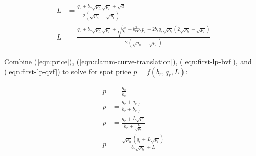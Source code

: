 \documentclass[table, twocolumn]{article}
\begin{document}
\begin{align} \label{eqn:first-lp-quadratic-4}
  L & = \frac{q_r + b_r \sqrt{p_h} \sqrt{p_l} + \sqrt{d}}
  {2(\sqrt{p_h} - \sqrt{p_l})} \nonumber                  \\
  L & = \frac{q_r + b_r \sqrt{p_h} \sqrt{p_l} + \sqrt{
      q_r^2 + b_r^2 p_h p_l + 2 b_r q_r \sqrt{p_h} (2 \sqrt{p_h} - \sqrt{p_l})
    }} {2(\sqrt{p_h} - \sqrt{p_l})}
\end{align}

Combine (\ref{eqn:price}), (\ref{eqn:clamm-curve-translation}),
(\ref{eqn:first-lp-bvf}), and (\ref{eqn:first-lp-qvf}) to solve for spot price
$p = f(b_r, q_r, L)$:

\begin{align} \label{eqn:first-lp-spot-price}
  p &= \frac{q_v}{b_v} \nonumber \\
  p &= \frac{q_r + q_{v, f}}{b_r + b_{v, f}} \nonumber \\
  p &= \frac{q_r + L \sqrt{p_l}}{b_r + \frac{L}{\sqrt{p_h}}} \nonumber \\
  p &= \frac{\sqrt{p_h}(q_r + L \sqrt{p_l})}{b_r \sqrt{p_h} + L}
\end{align}
\end{document}
